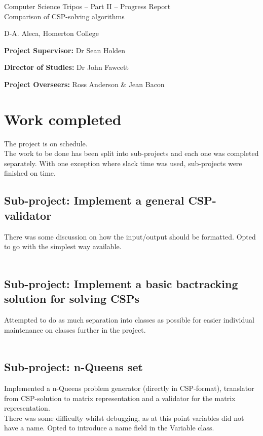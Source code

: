\documentclass[12pt,a4paper,twoside]{article}
\begin{document}
	\begin{center}
	\Large
	Computer Science Tripos -- Part II -- Progress Report\\[4mm]
	\LARGE
	Comparison of CSP-solving algorithms
	
	\large
	D-A. Aleca, Homerton College
	\end{center}
	
	\vspace{5mm}
	
	\textbf{Project Supervisor:} Dr Sean Holden 
	
	\textbf{Director of Studies:} Dr John Fawcett
	
	\textbf{Project Overseers:} Ross Anderson  \& Jean Bacon
	
	\section*{Work completed}
	The project is on schedule.\\
	The work to be done has been split into sub-projects and each one was completed separately. With one exception where slack time was used, sub-projects were finished on time.\\
	\subsection*{Sub-project: Implement a general CSP-validator}
	There was some discussion on how the input/output should be formatted. Opted to go with the simplest way available.\\\\
	\subsection*{Sub-project: Implement a basic bactracking solution for solving CSPs}
	Attempted to do as much separation into classes as possible for easier individual maintenance on classes further in the project.\\\\
	\subsection*{Sub-project: n-Queens set}
	Implemented a n-Queens problem generator (directly in CSP-format), translator from CSP-solution to matrix representation and a validator for the matrix representation.\\
	There was some difficulty whilst debugging, as at this point variables did not have a name. Opted to introduce a name field in the Variable class.\\\\
\end{document}
